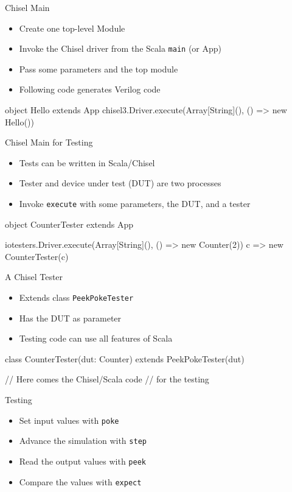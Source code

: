 \documentclass[xcolor=pdflatex,dvipsnames,table]{beamer}
\newcommand{\code}[1]{{\texttt{#1}}}
\begin{document}
\begin{frame}[fragile]{Chisel Main}

\begin{itemize}
\item Create one top-level Module
\item Invoke the Chisel driver from the Scala \code{main} (or App)
\item Pass some parameters and the top module
\item Following code generates Verilog code
\end{itemize}
\begin{chisel}
object Hello extends App {
  chisel3.Driver.execute(Array[String](), () => new Hello())
}
\end{chisel}
\end{frame}

\begin{frame}[fragile]{Chisel Main for Testing}
\begin{itemize}
\item Tests can be written in Scala/Chisel
\item Tester and device under test (DUT) are two processes
\item Invoke \code{execute} with some parameters, the DUT, and a tester
\end{itemize}
\begin{chisel}
object CounterTester extends App {

  iotesters.Driver.execute(Array[String](), () => new Counter(2)) {
    c => new CounterTester(c)
  }
}
\end{chisel}
\end{frame}

\begin{frame}[fragile]{A Chisel Tester}
\begin{itemize}
\item Extends class \code{PeekPokeTester}
\item Has the DUT as parameter
\item Testing code can use all features of Scala
\end{itemize}
\begin{chisel}
class CounterTester(dut: Counter) extends PeekPokeTester(dut) {

  // Here comes the Chisel/Scala code
  // for the testing
}
\end{chisel}
\end{frame}

\begin{frame}[fragile]{Testing}
\begin{itemize}
\item Set input values with \code{poke}
\item Advance the simulation with \code{step}
\item Read the output values with \code{peek}
\item Compare the values with \code{expect}
\end{itemize}
\end{frame}
\end{document}
